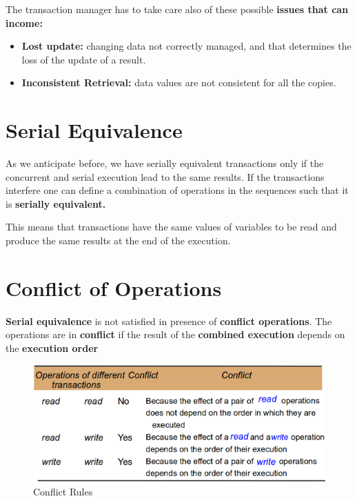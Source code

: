 The transaction manager has to take care also of these possible \textbf{issues that can income:}
\begin{itemize}
    \item \textbf{Lost update:}  changing data not correctly managed, and that determines the loss of the update of a result.
    
    
    
    \item \textbf{Inconsistent Retrieval:} data values are not consistent for all the copies.
    

    
\end{itemize}

\section{Serial Equivalence}
As we anticipate before, we have serially equivalent transactions only if the concurrent and serial execution lead to the same results. If the transactions interfere one can define a combination of operations in the sequences such that it is \textbf{serially equivalent.}

This means that transactions have the same values of variables to be read and produce the same results at the end of the execution.




\section{Conflict of Operations}
\textbf{Serial equivalence} is not satisfied in presence of \textbf{conflict operations}. The operations are in \textbf{conflict} if the result of the \textbf{combined execution} depends on the \textbf{execution order}

\begin{figure}[!h]
    \centering
    \includegraphics[width=.80\linewidth]{images/TransactionAndConcurrencyControl/conflictRules.png}
    \caption{Conflict Rules}
\end{figure}

